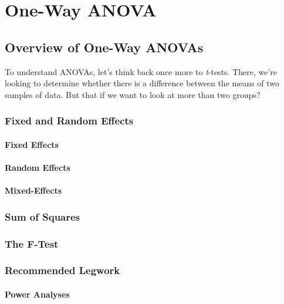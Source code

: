 
\chapter{One-Way ANOVA}

\section{Overview of One-Way ANOVAs}

To understand ANOVAs, let's think back once more to \textit{t}-tests. There, we're looking to determine whether there is a difference between the means of two samples of data. But that if we want to look at more than two groups? 

\subsection{Fixed and Random Effects}

\subsubsection{Fixed Effects}

\subsubsection{Random Effects}

\subsubsection{Mixed-Effects}

\subsection{Sum of Squares}

\subsection{The F-Test}

\subsection{Recommended Legwork}

\subsubsection{Power Analyses}

